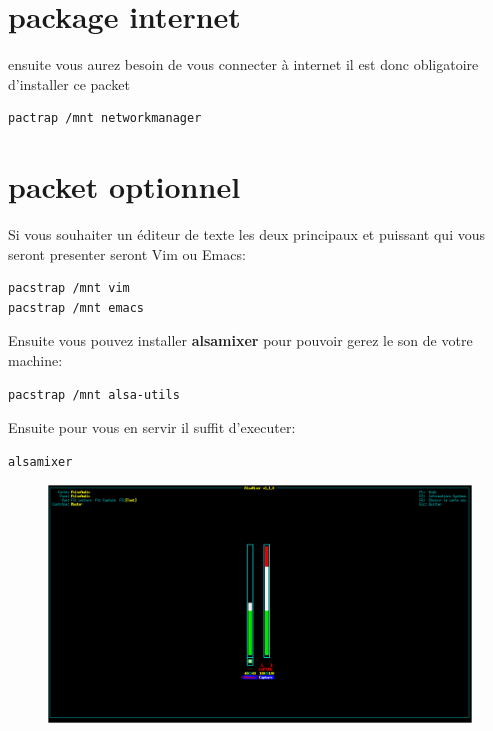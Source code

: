 \documentclass[a4paper]{book}
\begin{document}
\section{package internet}
ensuite vous aurez besoin de vous connecter à internet il est donc obligatoire
d'installer ce packet\\
\begin{lstlisting}
pactrap /mnt networkmanager
\end{lstlisting}

\pagebreak
\section{packet optionnel}
Si vous souhaiter un éditeur de texte les deux principaux et
puissant qui vous seront presenter seront Vim ou Emacs\@:\\
\begin{lstlisting}
pacstrap /mnt vim
pacstrap /mnt emacs
\end{lstlisting}
Ensuite vous pouvez installer \textbf{alsamixer} pour pouvoir gerez le son de
votre machine\@:\\
\begin{lstlisting}
pacstrap /mnt alsa-utils
\end{lstlisting}
Ensuite pour vous en servir il suffit d'executer\@:
\begin{lstlisting}
alsamixer
\end{lstlisting}
\begin{figure}[h]
  \includegraphics[width=\textwidth]{images/Alsamixer}
\end{figure}
\end{document}
